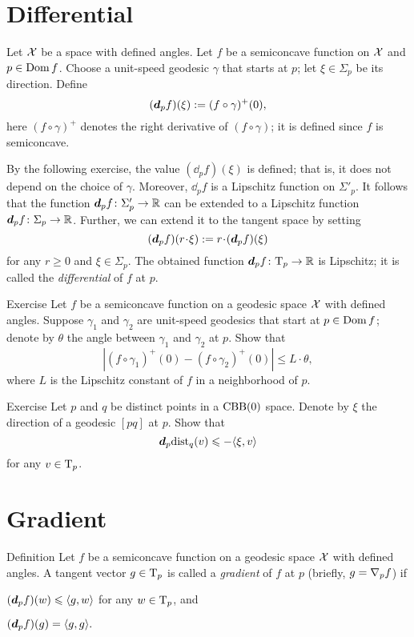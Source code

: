 \section{Differential}

Let $\mathcal{X}$ be a space with defined angles.
Let $f$ be a semiconcave function on $\mathcal{X}$ and $p\in \mathop{\rm Dom}\nolimits f$.
Choose a unit-speed geodesic $\gamma$ that starts at $p$;
let $\xi\in\Sigma_p$ be its direction.
Define 
\[(\bm{d}_pf)(\xi)\mathrel{:=}(f\circ\gamma)^+(0),\]
here $(f\circ\gamma)^+$ denotes the right derivative of $(f\circ\gamma)$;
it is defined since $f$ is semiconcave.

By the following exercise, the value $(\dd_pf)(\xi)$ is defined; that is, it does not depend on the choice of $\gamma$.
Moreover, $\dd_pf$ is a Lipschitz function on $\Sigma'_p$.
It follows that the function $\bm{d}_pf\colon\Sigma_p'\to\mathbb{R}$ can be extended to a Lipschitz function $\bm{d}_pf\colon\Sigma_p\to\mathbb{R}$.
Further, we can extend it to the tangent space by setting 
\[(\dd_pf)(r\cdot \xi)
\df
r\cdot (\dd_pf)(\xi)\]
for any $r\ge 0$ and $\xi\in\Sigma_p$.
The obtained function $\bm{d}_pf\colon\mathrm{T}_p\to\mathbb{R}$ is Lipschitz;
it is called the \emph{differential} of $f$ at $p$.

\begin{thm}{Exercise}\label{ex:df(xi)}
Let $f$ be a semiconcave function on a geodesic space $\mathcal{X}$ with defined angles.
Suppose $\gamma_1$ and $\gamma_2$ are unit-speed geodesics that start at $p\in \mathop{\rm Dom}\nolimits f$;
denote by $\theta$ the angle between $\gamma_1$ and $\gamma_2$ at $p$.
Show that 
\[|(f\circ\gamma_1)^+(0)-(f\circ\gamma_2)^+(0)|\le L\cdot \theta,\]
where $L$ is the Lipschitz constant of $f$ in a neighborhood of $p$.
\end{thm}

\begin{thm}{Exercise}\label{ex:d(distfun)}
Let $p$ and $q$ be distinct points in a $\mathrm{CBB}(0)$ space.
Denote by $\xi$ the direction of a geodesic $[pq]$ at $p$.
Show that 
\[\bm{d}_p\mathrm{dist}_q(v)\leqslant -\langle\xi,v\rangle\]
for any $v\in\mathrm{T}_p$.
\end{thm}


\section{Gradient}\label{sec:grad-def}

\begin{thm}{Definition}\label{def:grad} 
Let $f$ be a semiconcave function on a geodesic space $\mathcal{X}$ with defined angles.
A tangent vector $g\in \mathrm{T}_p$ is called a 
\emph{gradient} of $f$ at $p$ 
(briefly,  $g\z=\nabla_p f$\index{$\nabla$}) if
\begin{subthm}{}
$(\bm{d}_p f)(w)\leqslant \langle g,w\rangle$ for any $w\in \mathrm{T}_p$, and
\end{subthm}

\begin{subthm}{}
$(\bm{d}_p f)(g) = \langle g,g\rangle.$
\end{subthm}
\end{thm}


